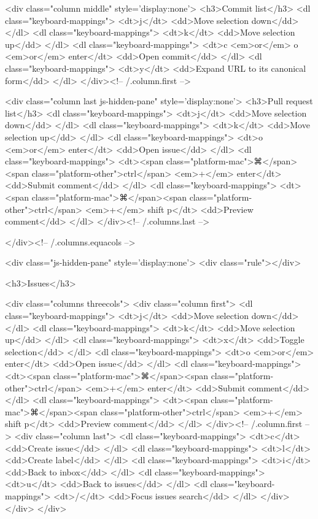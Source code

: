     <div class="column middle" style='display:none'>
      <h3>Commit list</h3>
      <dl class="keyboard-mappings">
        <dt>j</dt>
        <dd>Move selection down</dd>
      </dl>
      <dl class="keyboard-mappings">
        <dt>k</dt>
        <dd>Move selection up</dd>
      </dl>
      <dl class="keyboard-mappings">
        <dt>c <em>or</em> o <em>or</em> enter</dt>
        <dd>Open commit</dd>
      </dl>
      <dl class="keyboard-mappings">
        <dt>y</dt>
        <dd>Expand URL to its canonical form</dd>
      </dl>
    </div><!-- /.column.first -->

    <div class="column last js-hidden-pane" style='display:none'>
      <h3>Pull request list</h3>
      <dl class="keyboard-mappings">
        <dt>j</dt>
        <dd>Move selection down</dd>
      </dl>
      <dl class="keyboard-mappings">
        <dt>k</dt>
        <dd>Move selection up</dd>
      </dl>
      <dl class="keyboard-mappings">
        <dt>o <em>or</em> enter</dt>
        <dd>Open issue</dd>
      </dl>
      <dl class="keyboard-mappings">
        <dt><span class="platform-mac">⌘</span><span class="platform-other">ctrl</span> <em>+</em> enter</dt>
        <dd>Submit comment</dd>
      </dl>
      <dl class="keyboard-mappings">
        <dt><span class="platform-mac">⌘</span><span class="platform-other">ctrl</span> <em>+</em> shift p</dt>
        <dd>Preview comment</dd>
      </dl>
    </div><!-- /.columns.last -->

  </div><!-- /.columns.equacols -->

  <div class="js-hidden-pane" style='display:none'>
    <div class="rule"></div>

    <h3>Issues</h3>

    <div class="columns threecols">
      <div class="column first">
        <dl class="keyboard-mappings">
          <dt>j</dt>
          <dd>Move selection down</dd>
        </dl>
        <dl class="keyboard-mappings">
          <dt>k</dt>
          <dd>Move selection up</dd>
        </dl>
        <dl class="keyboard-mappings">
          <dt>x</dt>
          <dd>Toggle selection</dd>
        </dl>
        <dl class="keyboard-mappings">
          <dt>o <em>or</em> enter</dt>
          <dd>Open issue</dd>
        </dl>
        <dl class="keyboard-mappings">
          <dt><span class="platform-mac">⌘</span><span class="platform-other">ctrl</span> <em>+</em> enter</dt>
          <dd>Submit comment</dd>
        </dl>
        <dl class="keyboard-mappings">
          <dt><span class="platform-mac">⌘</span><span class="platform-other">ctrl</span> <em>+</em> shift p</dt>
          <dd>Preview comment</dd>
        </dl>
      </div><!-- /.column.first -->
      <div class="column last">
        <dl class="keyboard-mappings">
          <dt>c</dt>
          <dd>Create issue</dd>
        </dl>
        <dl class="keyboard-mappings">
          <dt>l</dt>
          <dd>Create label</dd>
        </dl>
        <dl class="keyboard-mappings">
          <dt>i</dt>
          <dd>Back to inbox</dd>
        </dl>
        <dl class="keyboard-mappings">
          <dt>u</dt>
          <dd>Back to issues</dd>
        </dl>
        <dl class="keyboard-mappings">
          <dt>/</dt>
          <dd>Focus issues search</dd>
        </dl>
      </div>
    </div>
  </div>

